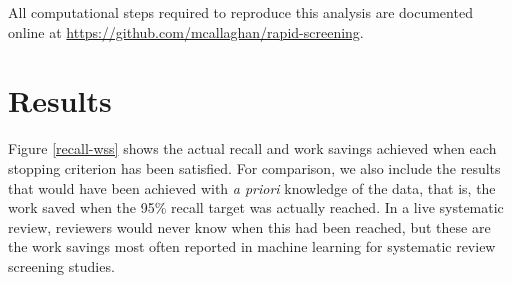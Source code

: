 \documentclass{bmcart}
\begin{document}
	
	All computational steps required to reproduce this analysis are documented online at \url{https://github.com/mcallaghan/rapid-screening}.
	
	\section*{Results}
	
	Figure \ref{recall-wss} shows the actual recall and work savings achieved when each stopping criterion has been satisfied. 
	For comparison, we also include the results that would have been achieved with \textit{a priori} knowledge of the data, that is, the work saved when the 95\% recall target was actually reached. In a live systematic review, reviewers would never know when this had been reached, but these are the work savings most often reported in machine learning for systematic review screening studies.
	
\end{document}
